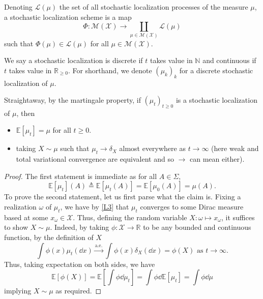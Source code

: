 \begin{definition}
  Denoting \(\mathcal{L}(\mu)\) the set of all stochastic localization processes of the measure
  \(\mu\), a stochastic localization scheme is a map 
  \[\Phi : \mathcal{M}(\mathcal{X}) \to \coprod_{\mu \in \mathcal{M}(\mathcal{X})} \mathcal{L}(\mu)\] 
  such that \(\Phi(\mu) \in \mathcal{L}(\mu)\) for all \(\mu \in \mathcal{M}(\mathcal{X})\).
\end{definition}

We say a stochastic localization is discrete if \(t\) takes value in \(\mathbb{N}\) and continuous 
if \(t\) takes value in \(\mathbb{R}_{\ge 0}\). For shorthand, we denote \((\mu_k)_k\) for a
discrete stochastic localization of \(\mu\).

\begin{proposition}\label{prop:stoch_loc}
  Straightaway, by the martingale property, if \((\mu_t)_{t \ge 0}\) is a stochastic localization of \(\mu\), 
  then 
  \begin{itemize}
    \item \(\mathbb{E}[\mu_t] = \mu\) for all \(t \ge 0\).
    \item taking \(X \sim \mu\) such that \(\mu_t \to \delta_X\) almost everywhere as \(t \to \infty\) 
      (here weak and total variational convergence are equivalent and so \(\to\) can mean either).
  \end{itemize}
\end{proposition}
\begin{proof}
  The first statement is immediate as for all \(A \in \Sigma\), 
  \[\mathbb{E}[\mu_t](A) \triangleq \mathbb{E}[\mu_t(A)] = \mathbb{E}[\mu_0(A)] = \mu(A).\]
  To prove the second statement, let us first parse what the claim is. Fixing a realization \(\omega\) of \(\mu_t\), 
  we have by \ref{L3} that \(\mu_t\) converges to some Dirac measure based at some \(x_\omega \in \mathcal{X}\). Thus, 
  defining the random variable \(X : \omega \mapsto x_\omega\), it suffices to show \(X \sim \mu\). 
  Indeed, by taking \(\phi : \mathcal{X} \to \mathbb{R}\) to be any bounded and continuous function, by the 
  definition of \(X\)
  \[\int \phi(x) \mu_t(\dd x) \xrightarrow{\text{a.e.}} \int \phi(x) \delta_{X}(\dd x) = \phi(X) \text{ as } t \to \infty.\]
  Thus, taking expectation on both sides, we have 
  \[\mathbb{E}[\phi(X)] = \mathbb{E}\left[\int \phi \dd \mu_t\right] = 
    \int \phi \dd \mathbb{E}[\mu_t] = \int \phi \dd \mu\]
  implying \(X \sim \mu\) as required.
\end{proof}

